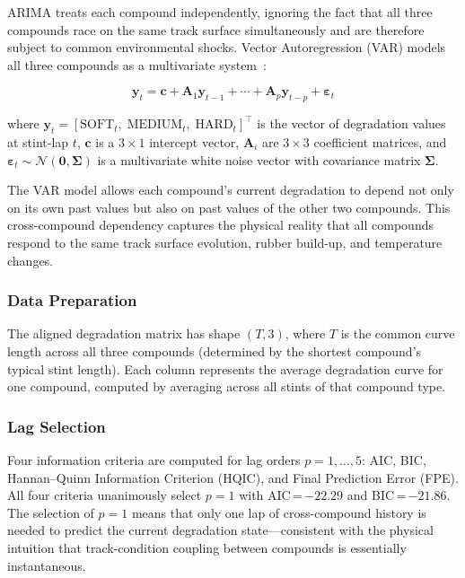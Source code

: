 \documentclass[journal,twoside]{IEEEtran}
\begin{document}
ARIMA treats each compound independently, ignoring the fact that all
three compounds race on the same track surface simultaneously and are
therefore subject to common environmental shocks.  Vector
Autoregression (VAR) models all three compounds as a multivariate
system~\cite{lutkepohl2005new}:

\begin{equation}
\mathbf{y}_t = \mathbf{c} + \mathbf{A}_1\mathbf{y}_{t-1} + \cdots +
\mathbf{A}_p\mathbf{y}_{t-p} + \boldsymbol{\varepsilon}_t
\label{eq:var}
\end{equation}

\noindent where $\mathbf{y}_t = [\text{SOFT}_t,\;\text{MEDIUM}_t,\;
\text{HARD}_t]^{\!\top}$ is the vector of degradation values at
stint-lap $t$, $\mathbf{c}$ is a $3 \times 1$ intercept vector,
$\mathbf{A}_i$ are $3\times3$ coefficient matrices, and
$\boldsymbol{\varepsilon}_t \sim \mathcal{N}(\mathbf{0},
\boldsymbol{\Sigma})$ is a multivariate white noise vector with
covariance matrix $\boldsymbol{\Sigma}$.

The VAR model allows each compound's current degradation to depend not
only on its own past values but also on past values of the other two
compounds.  This cross-compound dependency captures the physical
reality that all compounds respond to the same track surface evolution,
rubber build-up, and temperature changes.

\subsubsection{Data Preparation}

The aligned degradation matrix has shape $(T, 3)$, where $T$ is the
common curve length across all three compounds (determined by the
shortest compound's typical stint length).  Each column represents the
average degradation curve for one compound, computed by averaging across
all stints of that compound type.

\subsubsection{Lag Selection}

Four information criteria are computed for lag orders $p = 1, \ldots, 5$:
AIC, BIC, Hannan--Quinn Information Criterion (HQIC), and Final
Prediction Error (FPE).  All four criteria unanimously select $p=1$
with AIC\,=\,$-22.29$ and BIC\,=\,$-21.86$.  The selection of $p=1$
means that only one lap of cross-compound history is needed to predict
the current degradation state---consistent with the physical intuition
that track-condition coupling between compounds is essentially
instantaneous.
\end{document}
